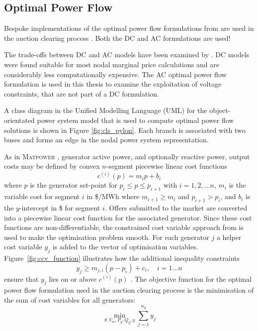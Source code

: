 \subsection{Optimal Power Flow}
\label{sec:pw_linear}
Bespoke implementations of the optimal power flow formulations from \matpower
are used in the auction clearing process \cite[\S5]{pserc:mp_manual}.
Both the DC and AC formulations are used!

The trade-offs between DC and AC models have been examined by
.  DC models were found suitable for most nodal marginal
price calculations and are considerably less computationally expensive.  The
AC optimal power flow formulation is used in this thesis to examine the
exploitation of voltage constraints, that are not part of a DC formulation.

A class diagram in the Unified Modelling Language (UML) for the
object-orientated power system model that is used to compute optimal power
flow solutions is shown in Figure \ref{fig:cls_pylon}.  Each branch is
associated with two buses and forms an edge in the nodal power system
representation.


As in \textsc{Matpower} \cite[p.26]{pserc:mp_manual}, generator active
power, and optionally reactive power, output costs may be defined by convex
$n$-segment piecewise linear cost functions
\begin{equation}
c^{(i)}(p) = m_ip + b_i
\end{equation}
where $p$ is the generator set-point for $p_i \leq p \leq p_{i+1}$ with
$i = 1,2,\dotsc n$, $m_i$ is the variable cost for segment $i$ in
\$/MWh where $m_{i+1} \geq m_i$ and $p_{i+1} > p_i$, and $b_i$ is the
$y$-intercept in \$ for segment $i$.  Offers submitted to the market are
converted into a piecewise linear cost function for the associated generator.
Since these cost functions are non-differentiable, the constrained cost
variable approach from  is used to make the optimisation
problem smooth.  For each generator $j$ a helper cost variable $y_j$ is added
to the vector of optimisation variables.  Figure~\ref{fig:ccv_function}
illustrates how the additional inequality constraints
\begin{equation}
y_j \geq m_{j,i}(p-p_i) + c_i, \quad i = 1\dotsc n
\end{equation}
ensure that $y_j$ lies on or above $c^{(i)}(p)$
\cite[Figure5-3]{pserc:mp_manual}.  The objective function for the optimal
power flow formulation used in the auction clearing process is the minimisation
of the sum of cost variables for all generators:
\begin{equation}
\min_{\theta, V_m, P_g, Q_g, y} \sum_{j=1}^{n_g}y_j
\end{equation}

